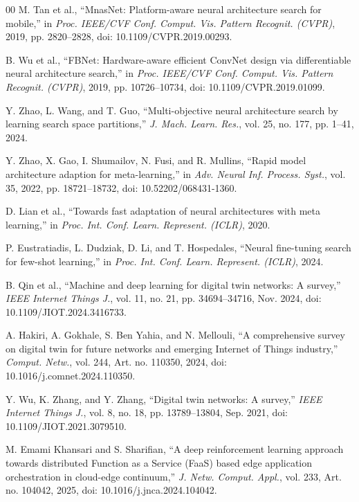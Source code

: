 \documentclass[a4paper,fleqn]{cas-sc}
\begin{document}
\begin{thebibliography}{00}
 M. Tan et al., ``MnasNet: Platform-aware neural architecture search for mobile,'' in \emph{Proc. IEEE/CVF Conf. Comput. Vis. Pattern Recognit. (CVPR)}, 2019, pp. 2820--2828, doi: 10.1109/CVPR.2019.00293.

 B. Wu et al., ``FBNet: Hardware-aware efficient ConvNet design via differentiable neural architecture search,'' in \emph{Proc. IEEE/CVF Conf. Comput. Vis. Pattern Recognit. (CVPR)}, 2019, pp. 10726--10734, doi: 10.1109/CVPR.2019.01099.

 Y. Zhao, L. Wang, and T. Guo, ``Multi-objective neural architecture search by learning search space partitions,'' \emph{J. Mach. Learn. Res.}, vol. 25, no. 177, pp. 1--41, 2024.

Y. Zhao, X. Gao, I. Shumailov, N. Fusi, and R. Mullins,
``Rapid model architecture adaption for meta-learning,''
in \emph{Adv. Neural Inf. Process. Syst.},
vol. 35, 2022, pp. 18721--18732,
doi: 10.52202/068431-1360.

D. Lian et al.,
``Towards fast adaptation of neural architectures with meta learning,''
in \emph{Proc. Int. Conf. Learn. Represent. (ICLR)}, 2020.

P. Eustratiadis, L. Dudziak, D. Li, and T. Hospedales,
``Neural fine-tuning search for few-shot learning,''
in \emph{Proc. Int. Conf. Learn. Represent. (ICLR)}, 2024.

 B. Qin et al., ``Machine and deep learning for digital twin networks: A survey,'' \emph{IEEE Internet Things J.}, vol. 11, no. 21, pp. 34694--34716, Nov. 2024, doi: 10.1109/JIOT.2024.3416733.

 A. Hakiri, A. Gokhale, S. Ben Yahia, and N. Mellouli, ``A comprehensive survey on digital twin for future networks and emerging Internet of Things industry,'' \emph{Comput. Netw.}, vol. 244, Art. no. 110350, 2024, doi: 10.1016/j.comnet.2024.110350.

 Y. Wu, K. Zhang, and Y. Zhang, ``Digital twin networks: A survey,'' \emph{IEEE Internet Things J.}, vol. 8, no. 18, pp. 13789--13804, Sep. 2021, doi: 10.1109/JIOT.2021.3079510.

M. Emami Khansari and S. Sharifian,
``A deep reinforcement learning approach towards distributed Function as a
Service (FaaS) based edge application orchestration in cloud-edge
continuum,''
\emph{J. Netw. Comput. Appl.}, vol. 233,
Art. no. 104042, 2025,
doi: 10.1016/j.jnca.2024.104042.


\end{thebibliography}
\end{document}
